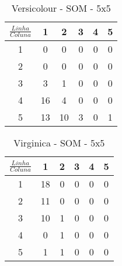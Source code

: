 \begin{table}[]
\centering
\caption{Versicolour - SOM - 5x5}
\label{my-label}
\begin{tabular}{|c|ccccc|}
\hline
$\frac{Linha}{Coluna}$ & \multicolumn{1}{c|}{1}     & \multicolumn{1}{c|}{2}     & \multicolumn{1}{c|}{3}    & \multicolumn{1}{c|}{4} & 5                         \\ \hline
1                      & 0                          & 0                          & 0                         & 0                      & 0                         \\ \cline{1-1}
2                      & 0                          & 0                          & 0                         & 0                      & 0                         \\ \cline{1-1}
3                      & \cellcolor[HTML]{34CDF9}3  & 1                          & 0                         & 0                      & 0                         \\ \cline{1-1}
4                      & \cellcolor[HTML]{34CDF9}16 & \cellcolor[HTML]{34CDF9}4  & 0                         & 0                      & 0                         \\ \cline{1-1}
5                      & \cellcolor[HTML]{34CDF9}13 & \cellcolor[HTML]{34CDF9}10 & \cellcolor[HTML]{34CDF9}3 & 0                      & \cellcolor[HTML]{34CDF9}1 \\ \hline
\end{tabular}
\end{table}


\begin{table}[]
\centering
\caption{Virginica - SOM - 5x5}
\label{my-label}
\begin{tabular}{|c|ccccc|}
\hline
$\frac{Linha}{Coluna}$ & \multicolumn{1}{c|}{1}     & \multicolumn{1}{c|}{2}    & \multicolumn{1}{c|}{3} & \multicolumn{1}{c|}{4} & 5 \\ \hline
1                      & \cellcolor[HTML]{34CDF9}18 & 0                         & 0                      & 0                      & 0 \\ \cline{1-1}
2                      & \cellcolor[HTML]{34CDF9}11 & 0                         & 0                      & 0                      & 0 \\ \cline{1-1}
3                      & \cellcolor[HTML]{34CDF9}10 & \cellcolor[HTML]{34CDF9}1 & 0                      & 0                      & 0 \\ \cline{1-1}
4                      & 0                          & \cellcolor[HTML]{34CDF9}1 & 0                      & 0                      & 0 \\ \cline{1-1}
5                      & \cellcolor[HTML]{34CDF9}1  & \cellcolor[HTML]{34CDF9}1 & 0                      & 0                      & 0 \\ \hline
\end{tabular}
\end{table}



